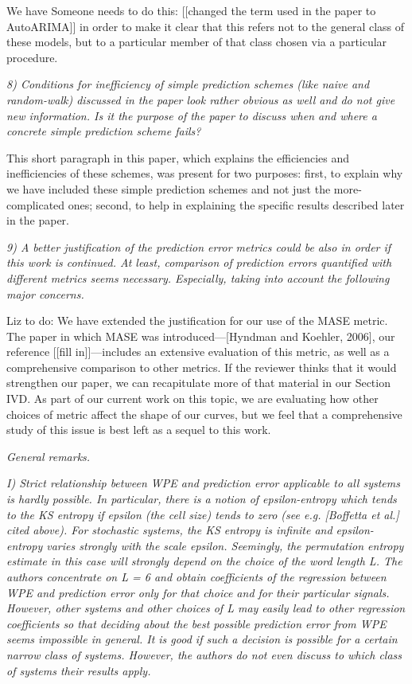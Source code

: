 \documentclass[12pt]{article}
\newcommand{\alert}[1]{{\color{red}#1}}
\begin{document}
We have \alert{Someone needs to do this: [[changed the term used in
      the paper to AutoARIMA]]} in order to make it clear that this
refers not to the general class of these models, but to a particular
member of that class chosen via a particular procedure.

\smallskip

\emph{8) Conditions for inefficiency of simple prediction schemes
  (like naive and random-walk) discussed in the paper look rather
  obvious as well and do not give new information. Is it the purpose
  of the paper to discuss when and where a concrete simple prediction
  scheme fails?}

This short paragraph in this paper, which explains the efficiencies
and inefficiencies of these schemes, was present for two purposes:
first, to explain why we have included these simple prediction schemes
and not just the more-complicated ones; second, to help in explaining
the specific results described later in the paper.

\smallskip

\emph{9) A better justification of the prediction error metrics could
  be also in order if this work is continued. At least, comparison of
  prediction errors quantified with different metrics seems
  necessary. Especially, taking into account the following major
  concerns.}

\alert{Liz to do: We have extended the justification for our use of
  the MASE metric.}  The paper in which MASE was introduced---[Hyndman
  and Koehler, 2006], our reference \alert{[[fill in]]}---includes an
extensive evaluation of this metric, as well as a comprehensive
comparison to other metrics.  If the reviewer thinks that it would
strengthen our paper, we can recapitulate more of that material in our
Section IVD. As part of our current work on this topic, we are
evaluating how other choices of metric affect the shape of our curves,
but we feel that a comprehensive study of this issue is best left as a
sequel to this work.

\smallskip

\noindent\emph{General remarks.}

\emph{I) Strict relationship between WPE and prediction error
  applicable to all systems is hardly possible. In particular, there
  is a notion of epsilon-entropy which tends to the KS entropy if
  epsilon (the cell size) tends to zero (see e.g.  [Boffetta et al.]
  cited above). For stochastic systems, the KS entropy is infinite and
  epsilon-entropy varies strongly with the scale epsilon. Seemingly,
  the permutation entropy estimate in this case will strongly depend
  on the choice of the word length L. The authors concentrate on L = 6
  and obtain coefficients of the regression between WPE and prediction
  error only for that choice and for their particular
  signals. However, other systems and other choices of L may easily
  lead to other regression coefficients so that deciding about the
  best possible prediction error from WPE seems impossible in
  general. It is good if such a decision is possible for a certain
  narrow class of systems. However, the authors do not even discuss to
  which class of systems their results apply.}
\end{document}
